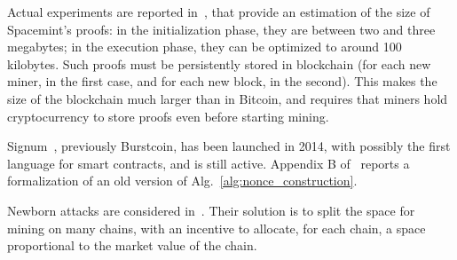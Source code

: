 Actual experiments are reported in~\cite{ParkKFGAP18},
that provide an estimation of the size of Spacemint's proofs:
in the initialization phase, they are between two and three megabytes;
in the execution phase, they can be optimized to around 100 kilobytes.
Such proofs must be persistently stored in
blockchain (for each new miner, in the first case, and for each new block, in the second).
This makes the size of the blockchain much larger than in Bitcoin, and requires
that miners hold cryptocurrency to store proofs even before starting mining.

Signum~\cite{Signum}, previously Burstcoin, has been launched in 2014, with possibly
the first language for smart contracts, and is still active.
Appendix B of~\cite{ParkKFGAP18} reports a formalization of an old version
of Alg.~\ref{alg:nonce_construction}.

Newborn attacks are considered in~\cite{TangZDWLG0L19}. Their solution is
to split the space for mining on many chains, with an
incentive to allocate, for each chain, a space proportional
to the market value of the chain.
